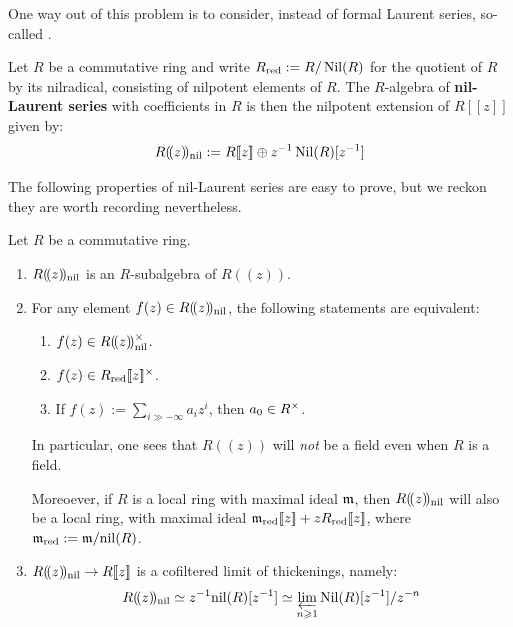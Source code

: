         One way out of this problem is to consider, instead of formal Laurent series, so-called . 
        \begin{definition} \label{def: nil_laurent_series}
            Let $R$ be a commutative ring and write $R_{\mathrm{red}} := R/\operatorname{Nil}(R)$ for the quotient of $R$ by its nilradical, consisting of nilpotent elements of $R$. The $R$-algebra of \textbf{nil-Laurent series} with coefficients in $R$ is then the nilpotent extension of $R[\![z]\!]$ given by:
                $$R(\!(z)\!)_{\mathrm{nil}} := R[\![z]\!] \oplus z^{-1} \operatorname{Nil}(R)[z^{-1}]$$
        \end{definition}
        The following properties of nil-Laurent series are easy to prove, but we reckon they are worth recording nevertheless.
        \begin{lemma}
            Let $R$ be a commutative ring.
            \begin{enumerate}
                \item $R(\!(z)\!)_{\mathrm{nil}}$ is an $R$-subalgebra of $R(\!(z)\!)$. 
                \item For any element $f(z) \in R(\!(z)\!)_{\mathrm{nil}}$, the following statements are equivalent:
                \begin{enumerate}
                    \item $f(z) \in R(\!(z)\!)_{\nil}^{\x}$.
                    \item $f(z) \in R_{\red}[\![z]\!]^{\x}$.
                    \item If $f(z) := \sum_{i \gg -\infty} a_i z^i$, then $a_0 \in R^{\x}$.
                \end{enumerate}
                In particular, one sees that $R(\!(z)\!)$ will \textit{not} be a field even when $R$ is a field.

                Moreoever, if $R$ is a local ring with maximal ideal $\mathfrak{m}$, then $R(\!(z)\!)_{\mathrm{nil}}$ will also be a local ring, with maximal ideal $\mathfrak{m}_{\mathrm{red}}[\![z]\!] + z R_{\mathrm{red}}[\![z]\!]$, where $\mathfrak{m}_{\mathrm{red}} := \mathfrak{m}/\mathrm{nil}(R)$.
                \item $R(\!(z)\!)_{\mathrm{nil}} \to R[\![z]\!]$ is a cofiltered limit of thickenings, namely:
                    $$R(\!(z)\!)_{\mathrm{nil}} \simeq z^{-1} \mathrm{nil}(R)[z^{-1}] \simeq \varprojlim_{n \geqslant 1} \operatorname{Nil}(R)[z^{-1}]/z^{-n}$$
            \end{enumerate}
        \end{lemma}